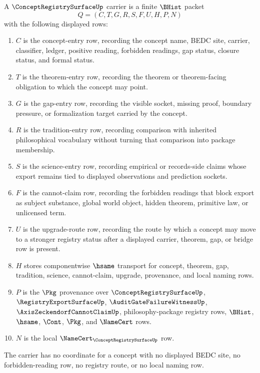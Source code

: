 \begin{definition}
\label{def:concept-registry-surface-carrier}
A $\ConceptRegistrySurfaceUp$ carrier is a finite $\BHist$ packet
$$
Q=(C,T,G,R,S,F,U,H,P,N)
$$
with the following displayed rows:
\begin{enumerate}
\item $C$ is the concept-entry row, recording the concept name, BEDC site, carrier, classifier, ledger, positive reading, forbidden readings, gap status, closure status, and formal status.
\item $T$ is the theorem-entry row, recording the theorem or theorem-facing obligation to which the concept may point.
\item $G$ is the gap-entry row, recording the visible socket, missing proof, boundary pressure, or formalization target carried by the concept.
\item $R$ is the tradition-entry row, recording comparison with inherited philosophical vocabulary without turning that comparison into package membership.
\item $S$ is the science-entry row, recording empirical or records-side claims whose export remains tied to displayed observations and prediction sockets.
\item $F$ is the cannot-claim row, recording the forbidden readings that block export as subject substance, global world object, hidden theorem, primitive law, or unlicensed term.
\item $U$ is the upgrade-route row, recording the route by which a concept may move to a stronger registry status after a displayed carrier, theorem, gap, or bridge row is present.
\item $H$ stores componentwise $\hsame$ transport for concept, theorem, gap, tradition, science, cannot-claim, upgrade, provenance, and local naming rows.
\item $P$ is the $\Pkg$ provenance over $\ConceptRegistrySurfaceUp$, $\RegistryExportSurfaceUp$, $\AuditGateFailureWitnessUp$, $\AxisZeckendorfCannotClaimUp$, philosophy-package registry rows, $\BHist$, $\hsame$, $\Cont$, $\Pkg$, and $\NameCert$ rows.
\item $N$ is the local $\NameCert_{\ConceptRegistrySurfaceUp}$ row.
\end{enumerate}
The carrier has no coordinate for a concept with no displayed BEDC site, no forbidden-reading row, no registry route, or no local naming row.
\end{definition}

